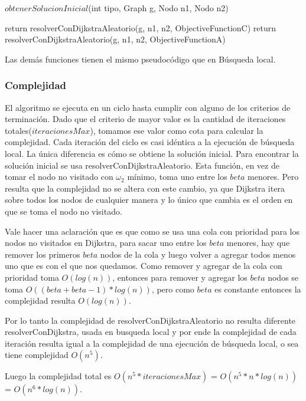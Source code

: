 \begin{algorithm}[H]
\caption{$obtenerSolucionInicial$(int tipo, Graph g, Nodo n1, Nodo n2)}
\begin{algorithmic}[1]
	\State return resolverConDijkstraAleatorio(g, n1, n2, ObjectiveFunctionC)
  \EndIf
  \State return resolverConDijkstraAleatorio(g, n1, n2, ObjectiveFunctionA)
\end{algorithmic}
\end{algorithm}

Las demás funciones tienen el mismo pseudocódigo que en Búsqueda local.

\subsubsection{Complejidad}

El algoritmo se ejecuta en un ciclo hasta cumplir con alguno de los criterios de terminación. Dado que el criterio de mayor valor es la cantidad de iteraciones totales($iteracionesMax$), tomamos ese valor como cota para calcular la complejidad.
Cada iteración del ciclo es casi idéntica a la ejecución de búsqueda local. La única diferencia es cómo se obtiene la solución inicial. Para encontrar la solución inicial se usa resolverConDijkstraAleatorio. Esta función, en vez de tomar el nodo no visitado con $\omega_2$ mínimo, toma uno entre los $beta$ menores. Pero resulta que la complejidad no se altera con este cambio, ya que Dijkstra itera sobre todos los nodos de cualquier manera y lo único que cambia es el orden en que se toma el nodo no visitado. 

Vale hacer una aclaración que es que como se usa una cola con prioridad para los nodos no visitados en Dijkstra, para sacar uno entre los $beta$ menores, hay que remover los primeros $beta$ nodos de la cola y luego volver a agregar todos menos uno que es con el que nos quedamos. Como remover y agregar de la cola con prioridad toma $O(log(n))$, entonces para remover y agregar los $beta$ nodos se toma $O((beta + beta-1) * log(n))$, pero como $beta$ es constante entonces la complejidad resulta $O(log(n))$. 

Por lo tanto la complejidad de resolverConDijkstraAleatorio no resulta diferente resolverConDijkstra, usada en busqueda local y por ende la complejidad de cada iteración resulta igual a la complejidad de una ejecución de búsqueda local, o sea tiene complejidad $O(n^5)$.

Luego la complejidad total es $O(n^5 * iteracionesMax)$ = $O(n^5 * n*log(n))$ = $O(n^6 * log(n))$.

